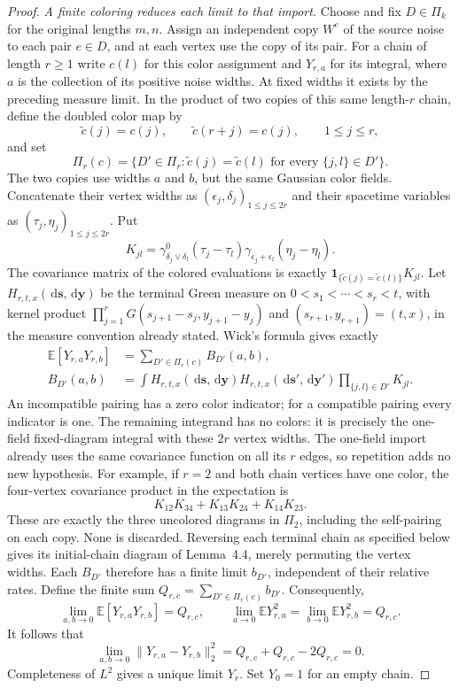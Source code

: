 \documentclass[12pt]{article}
\numberwithin{equation}{section}
\theoremstyle{definition}
\newcommand{\E}{\mathbb{E}}
\newcommand{\ud}{\,\mathrm{d}}
\begin{document}
\begin{proof}
  \emph{A finite coloring reduces each limit to that import.}
  Choose and fix $D\in\Pi_k$ for the original lengths $m,n$.
  Assign an independent copy $W^e$ of the source noise to each pair
  $e\in D$, and at each vertex use the copy of its pair. For a chain
  of length $r\ge1$ write $c(l)$ for this color assignment and
  $Y_{r,a}$ for its integral, where $a$ is the collection of its positive
  noise widths. At fixed widths it exists by the preceding measure limit.
  In the product of two copies of this same length-$r$ chain, define
  the doubled color map by
  \[
    \widetilde c(j)=c(j),\qquad
    \widetilde c(r+j)=c(j),\qquad 1\le j\le r,
  \]
  and set
  \[
    \Pi_r(c)=\{D'\in\Pi_r:
    \widetilde c(j)=\widetilde c(l)
    \text{ for every }\{j,l\}\in D'\}.
  \]
  The two copies use widths $a$ and $b$, but the same Gaussian color
  fields. Concatenate their vertex widths as
  $(\epsilon_j,\delta_j)_{1\le j\le2r}$ and their spacetime variables
  as $(\tau_j,\eta_j)_{1\le j\le2r}$. Put
  \[
    K_{jl}=\gamma^0_{\delta_j\vee\delta_l}(\tau_j-\tau_l)
    \gamma_{\epsilon_j+\epsilon_l}(\eta_j-\eta_l).
  \]
  The covariance matrix of the colored evaluations is exactly
  $\mathbf1_{\{\widetilde c(j)=\widetilde c(l)\}}K_{jl}$.
  Let $H_{r,t,x}(\ud\mathbf s,\ud\mathbf y)$ be the terminal
  Green measure on $0<s_1<\cdots<s_r<t$, with kernel product
  $\prod_{j=1}^rG(s_{j+1}-s_j,y_{j+1}-y_j)$ and
  $(s_{r+1},y_{r+1})=(t,x)$, in the measure convention already stated.
  Wick's formula gives exactly
  \[
    \begin{split}
      \E[Y_{r,a}Y_{r,b}]&=\sum_{D'\in\Pi_r(c)}B_{D'}(a,b),\\
      B_{D'}(a,b)&=\int H_{r,t,x}(\ud\mathbf s,\ud\mathbf y)
      H_{r,t,x}(\ud\mathbf s',\ud\mathbf y')
      \prod_{\{j,l\}\in D'}K_{jl}.
    \end{split}
  \]
  An incompatible pairing has a zero color indicator; for a compatible
  pairing every indicator is one. The remaining integrand has no colors:
  it is precisely the one-field fixed-diagram integral with these $2r$
  vertex widths. The one-field import already uses the same covariance
  function on all its $r$ edges, so repetition adds no new hypothesis.
  For example, if $r=2$ and both chain vertices have one color, the
  four-vertex covariance product in the expectation is
  \[
    K_{12}K_{34}+K_{13}K_{24}+K_{14}K_{23}.
  \]
  These are exactly the three uncolored diagrams in $\Pi_2$, including
  the self-pairing on each copy. None is discarded.
  Reversing each terminal chain as specified below gives its initial-chain
  diagram of Lemma~4.4, merely permuting the vertex widths. Each
  $B_{D'}$ therefore has a finite limit $b_{D'}$, independent of their
  relative rates. Define the finite sum
  $Q_{r,c}=\sum_{D'\in\Pi_r(c)}b_{D'}$. Consequently,
  \[
    \lim_{a,b\to0}\E[Y_{r,a}Y_{r,b}]=Q_{r,c},\qquad
    \lim_{a\to0}\E Y_{r,a}^2=\lim_{b\to0}\E Y_{r,b}^2=Q_{r,c}.
  \]
  It follows that
  \[
    \lim_{a,b\to0}\|Y_{r,a}-Y_{r,b}\|_2^2
    =Q_{r,c}+Q_{r,c}-2Q_{r,c}=0.
  \]
  Completeness of $L^2$ gives a unique limit $Y_r$. Set $Y_0=1$
  for an empty chain.


\end{proof}
\end{document}
